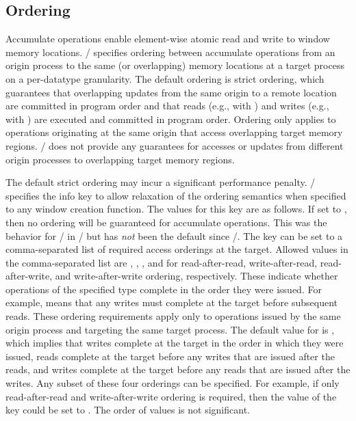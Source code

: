 \subsection{Ordering}
\label{sec:1sided-ordering}

Accumulate operations enable element-wise atomic read and write to window
memory locations. \MPI/ specifies ordering between accumulate operations
from an origin process to the same (or overlapping) memory locations at
a target process on a per-datatype granularity. The default ordering is
strict ordering, which guarantees that overlapping updates from the same
origin to a remote location are committed in program order and that
reads (e.g., with ) and writes (e.g., with
) are executed and committed in program order.
Ordering only applies to operations originating at the same origin that
access overlapping target memory regions. \MPI/ does not provide any
guarantees for accesses or updates from different
origin processes
to overlapping
target memory regions.

The default strict ordering may incur a significant performance penalty.
\MPI/ specifies the info key  to allow relaxation
of the ordering semantics when specified to any window creation
function. 
The values for this key are as follows.
If set to ,
then no ordering will be guaranteed for accumulate operations.  This was the
behavior for \RMA/ in \MPIII/ but has \emph{not} been the default since \MPIIII/.
The key can be set to a
comma-separated list of required access orderings at the target. Allowed
values in the comma-separated list are , ,
, and  for read-after-read, write-after-read,
read-after-write, and write-after-write ordering, respectively. These indicate 
whether operations of the specified type complete in the order they were 
issued.  
For example,  means that any writes must complete at the target 
before subsequent reads.
These ordering requirements apply only to operations issued 
by the same origin process and targeting the same target process.  
The default value for  is 
, which implies that writes complete at the target 
in the order in which they were issued, reads complete at the target before
any writes that are issued after the reads, and writes complete at the target 
before any reads that are issued after the writes.  Any subset of these four 
orderings can be specified.
For example, if only
read-after-read and write-after-write ordering is required, 
then the value of the
 key could be set to .
The order of values is not significant. 

